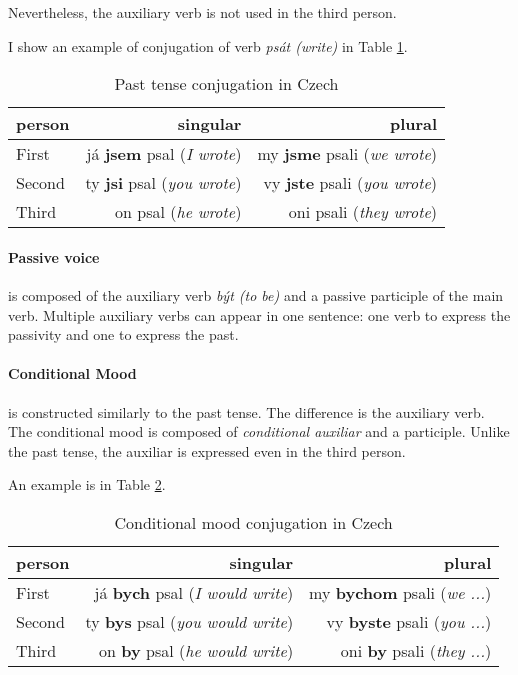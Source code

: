 Nevertheless, the auxiliary verb is not used in the third person.

I show an example of conjugation of verb \emph{psát (write)} in Table \ref{tab:past-tense-conj}.

\begin{table}[!ht]
	\caption{Past tense conjugation in Czech}
	\label{tab:past-tense-conj}
	\begin{center}
		\begin{tabular}{l|r|r}
			person & singular & plural \\
			\hline
			First & já \textbf{jsem} psal (\emph{I wrote}) & my \textbf{jsme} psali (\emph{we wrote}) \\
			Second & ty \textbf{jsi} psal (\emph{you wrote}) & vy \textbf{jste} psali (\emph{you wrote})  \\
			Third & on psal (\emph{he wrote}) & oni psali (\emph{they wrote})  \\
		\end{tabular}
	\end{center}
\end{table}

\paragraph{Passive voice} is composed of the auxiliary verb \emph{být (to be)} and a passive participle of the main verb. Multiple auxiliary verbs can appear in one sentence: one verb to express the passivity and one to express the past.

\paragraph{Conditional Mood} is constructed similarly to the past tense. The difference is the auxiliary verb. The conditional mood is composed of \emph{conditional auxiliar} and a participle. Unlike the past tense, the auxiliar is expressed even in the third person.

An example is in Table \ref{tab:cond}.

\begin{table}[!ht]
	\caption{Conditional mood conjugation in Czech}
	\label{tab:cond}
	\begin{center}
		\begin{tabular}{l|r|r}
			person & singular & plural \\
			\hline
			First & já \textbf{bych} psal (\emph{I would write}) & my \textbf{bychom} psali (\emph{we ...}) \\
			Second & ty \textbf{bys} psal (\emph{you would write}) & vy \textbf{byste} psali (\emph{you ...})  \\
			Third & on \textbf{by} psal (\emph{he would write}) & oni \textbf{by} psali (\emph{they ...})  \\
		\end{tabular}
	\end{center}
\end{table}

